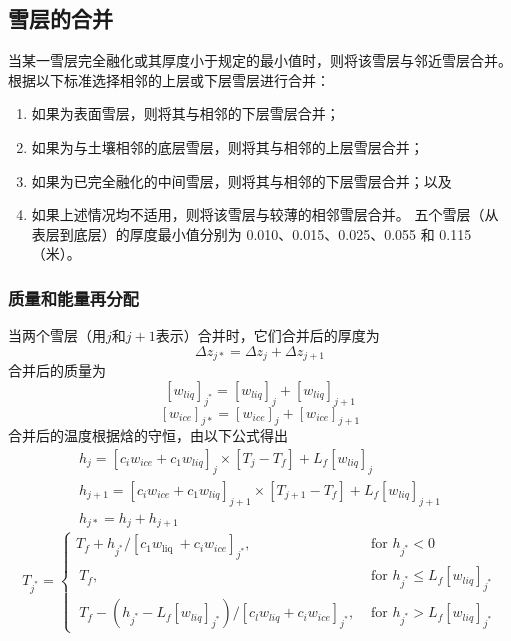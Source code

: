 \subsection{雪层的合并}
当某一雪层完全融化或其厚度小于规定的最小值时，则将该雪层与邻近雪层合并。根据以下标准选择相邻的上层或下层雪层进行合并：
\begin{enumerate}
\item 如果为表面雪层，则将其与相邻的下层雪层合并；
\item 如果为与土壤相邻的底层雪层，则将其与相邻的上层雪层合并；
\item 如果为已完全融化的中间雪层，则将其与相邻的下层雪层合并；以及
\item 如果上述情况均不适用，则将该雪层与较薄的相邻雪层合并。
五个雪层（从表层到底层）的厚度最小值分别为 0.010、0.015、0.025、0.055 和 0.115（米）。

\end{enumerate}

\subsubsection{质量和能量再分配}

当两个雪层（用$j$和$j+1$表示）合并时，它们合并后的厚度为
\begin{equation}
\Delta {z}_{{j} *}=\Delta {z}_{{j}}+\Delta {z}_{{j}+1}
\end{equation}
合并后的质量为
\begin{equation}
\left[{w}_{{liq}}\right]_{{j}^{*}}=\left[{w}_{{liq}}\right]_{{j}}+\left[{w}_{{liq}}\right]_{{j}+1}
\end{equation}
\begin{equation}
\left[{w}_{ {ice }}\right]_{j *}=\left[{w}_{ {ice }}\right]_{j}+\left[{w}_{ {ice }}\right]_{j+1}
\end{equation}
合并后的温度根据焓的守恒，由以下公式得出
\begin{equation}
\begin{array}{l}h_{j}=\left[c_{i} w_{ {ice }}+c_{1} w_{ {liq }}\right]_{j} \times\left[T_{j}-T_{f}\right]+L_{f}\left[w_{ {liq }}\right]_{j} \\ h_{j+1}=\left[c_{i} w_{ {ice }}+c_{1} w_{ {liq }}\right]_{j+1} \times\left[T_{j+1}-T_{f}\right]+L_{f}\left[w_{ {liq }}\right]_{j+1} \\ h_{j *}=h_{j}+h_{j+1}\end{array}
\end{equation}
\begin{equation}
{T}_{{j}^{*}}=\left\{\begin{array}{ll}{T}_{{f}}+{h}_{{j}^{*}} /\left[{c}_{1} {w}_{\text {liq }}+{c}_{{i}} {w}_{{ice}}\right]_{{j}^{*}}, & \text { for } {h}_{{j}^{*}}<0 \\ {~T}_{{f}}, & \text { for } {h}_{{j}^{*}} \leq {L}_{{f}}\left[{w}_{{liq}}\right]_{{j}^{*}} \\ {~T}_{{f}}-\left({h}_{{j}^{*}}-{L}_{{f}}\left[{w}_{{liq}}\right]_{{j}^{*}}\right) /\left[{c}_{{l}} {w}_{{liq}}+{c}_{{i}} {w}_{{ice}}\right]_{{j}^{*}}, & \text { for } {h}_{{j}^{*}}>{L}_{{f}}\left[{w}_{{liq}}\right]_{{j}^{*}}\end{array}\right.
\end{equation}


